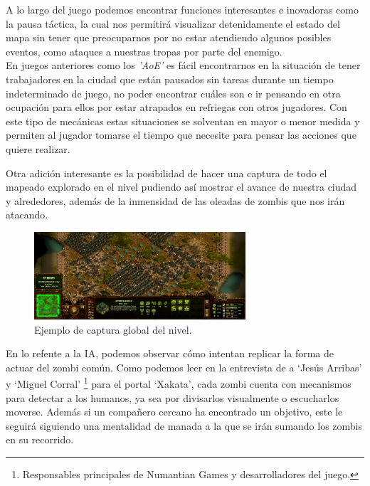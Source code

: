 A lo largo del juego podemos encontrar funciones interesantes e inovadoras como la pausa
táctica, la cual nos permitirá visualizar detenidamente el estado del mapa sin tener que
preocuparnos por no estar atendiendo algunos posibles eventos, como ataques a nuestras
tropas por parte del enemigo.\\ 
En juegos anteriores como los \textit{'\ac{AoE}'} es
fácil encontrarnos en la situación de tener trabajadores en la ciudad que están pausados sin tareas
durante un tiempo indeterminado de juego, no poder encontrar cuáles son e ir pensando en otra ocupación para ellos
por estar atrapados en refriegas con otros jugadores. Con este tipo de mecánicas estas situaciones
se solventan en mayor o menor medida y permiten al jugador tomarse el tiempo que
necesite para pensar las acciones que quiere realizar.

Otra adición interesante es la posibilidad de hacer una captura de todo el mapeado explorado
en el nivel pudiendo así mostrar el avance de nuestra ciudad y alrededores, además de la 
inmensidad de las oleadas de zombis que nos irán atacando.

\begin{figure}[ht]
\centering
\includegraphics[width=0.7\textwidth]{imagenes/marco_teo/referentes/tab_4.png}
\caption{Ejemplo de captura global del nivel.}
\label{img:tab_4}
\end{figure}

En lo refente a la \ac{IA}, podemos observar cómo intentan replicar la forma de actuar del
zombi común. Como podemos leer en la entrevista de \citeauthor*{Sucasas2018} 
a `Jesús Arribas' y `Miguel Corral' \footnote{Responsables principales de Numantian Games y desarrolladores del juego.}
para el portal `Xakata', cada zombi cuenta con mecanismos para 
detectar a los humanos, ya sea por divisarlos visualmente o escucharlos moverse. Además si un 
compañero cercano ha encontrado un objetivo, este le seguirá siguiendo 
una mentalidad de manada a la que se irán sumando los zombis en su recorrido.

